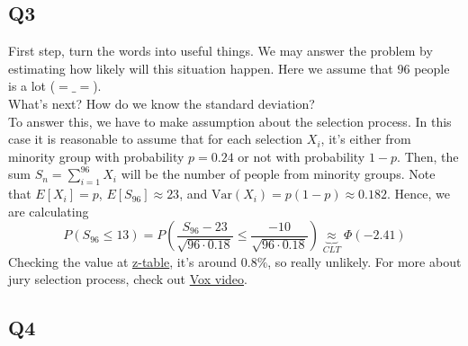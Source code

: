 \documentclass[12pt]{article}
\begin{document}
\subsection*{Q3}
First step, turn the words into useful things. We may answer the problem by estimating how likely will this situation happen. 
Here we assume that \(96\) people is a lot ($=\_=$). 
\\ 
What's next? How do we know the standard deviation? \\
To answer this, we have to make assumption about the selection process. In this case it is reasonable to assume that for each selection \(X_i\), it's either from minority group with probability \(p = 0.24\) or not with probability \(1-p\). 
Then, the sum \(S_n = \sum_{i=1}^{96}X_i \) will be the number of people from minority groups. Note that \(E[X_i] = p\), \(E[S_{96} ] \approx 23\),  and \(\text{Var}(X_i) = p(1-p) \approx 0.182\).  Hence, we are calculating 
\[
   P(S_{96} \leq 13) = P(\frac{S_{96} - 23}{\sqrt{96 \cdot 0.18} } \leq \frac{-10}{\sqrt{96 \cdot 0.18} }) \underbrace{\approx}_{CLT} \Phi(-2.41) 
\]   
Checking the value at \href{https://www.z-table.com/}{z-table}, it's around \(0.8\%\), so really unlikely. 
For more about jury selection process, check out \href{https://youtu.be/cPRK_ABldIk}{Vox video}.  
\subsection*{Q4}
\end{document}
